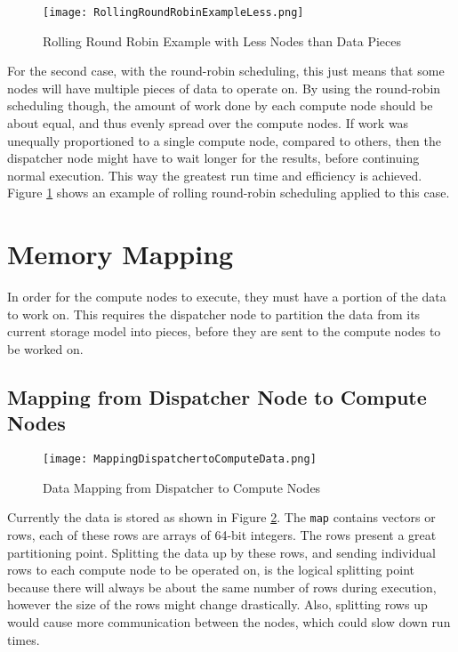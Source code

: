 \begin{figure}[t!]
\centering
\texttt{[image: RollingRoundRobinExampleLess.png]}
\caption{Rolling Round Robin Example with Less Nodes than Data Pieces}
\label{fig:RollingRoundRobinExampleLess}
\end{figure}
For the second case, with the round-robin scheduling, this just means that some nodes will have multiple pieces of data to operate on. By using the round-robin scheduling though, the amount of work done by each compute node should be about equal, and thus evenly spread over the compute nodes. If work was unequally proportioned to a single compute node, compared to others, then the dispatcher node might have to wait longer for the results, before continuing normal execution. This way the greatest run time and efficiency is achieved. Figure \ref{fig:RollingRoundRobinExampleLess} shows an example of rolling round-robin scheduling applied to this case.

\section{Memory Mapping} \label{sec:DistributedMemoryMapping}
In order for the compute nodes to execute, they must have a portion of the data to work on. This requires the dispatcher node to partition the data from its current storage model into pieces, before they are sent to the compute nodes to be worked on.

\subsection{Mapping from Dispatcher Node to Compute Nodes}
\begin{figure}[t!]
\centering
\texttt{[image: MappingDispatchertoComputeData.png]}
\caption{Data Mapping from Dispatcher to Compute Nodes}
\label{fig:MappingDispatcherToComputeData}
\end{figure}
Currently the data is stored as shown in Figure \ref{fig:MappingDispatcherToComputeData}. The \verb|map| contains vectors or rows, each of these rows are arrays of 64-bit integers. The rows present a great partitioning point. Splitting the data up by these rows, and sending individual rows to each compute node to be operated on, is the logical splitting point because there will always be about the same number of rows during execution, however the size of the rows might change drastically. Also, splitting rows up would cause more communication between the nodes, which could slow down run times. 


